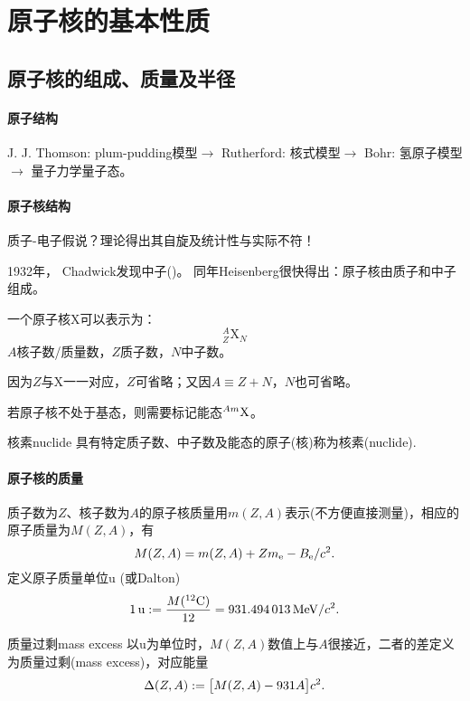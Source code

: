 \section{原子核的基本性质}
\subsection{原子核的组成、质量及半径}
\paragraph{原子结构}J. J. Thomson: plum-pudding模型$\to$ Rutherford: 核式模型$\to$ Bohr: 氢原子模型$\to$ 量子力学量子态。
\paragraph{原子核结构}
质子-电子假说？理论得出其自旋及统计性与实际不符！

1932年， Chadwick发现中子()。
同年Heisenberg很快得出：原子核由质子和中子组成。

一个原子核X可以表示为：
\[
	_Z^A\mathrm X_N
\]
$A$核子数/质量数，$Z$质子数，$N$中子数。

因为$Z$与X一一对应，$Z$可省略；又因$A\equiv Z+N$，$N$也可省略。

若原子核不处于基态，则需要标记能态${^{Am}\mathrm{X}}$。
\begin{definition}{核素}{nuclide}
	具有特定质子数、中子数及能态的原子(核)称为核素(nuclide).
\end{definition}
\iffalse
\begin{definition}{原子核相关名词}{}
	\begin{compactitem}
		\item 核素：；
		\item 同位素：原子序数$Z$相同但质量数$A$不同的核素；
		\item 同位素丰度：元素中各同位素天然含量的原子数百分比；
		\item 同中异荷素：$N$相同，$Z$不同的核素；
		\item 同量异位素：$A$相同，$Z$(或$N$)不同的核素；
		\item 同质异能素：$Z$和$N$相同，而
		能态不同的核素；
		\item 偶$A$核、奇$A$核、偶偶核、奇奇核……
		\item 镜像核：$N$与$Z$互换的两个核素。
	\end{compactitem}
\end{definition}
\fi
\paragraph{原子核的质量}质子数为$Z$、核子数为$A$的原子核质量用$m(Z,A)$表示(不方便直接测量)，相应的原子质量为$M(Z,A)$，有
\[
	M(Z,A)=m(Z,A)+Zm_\mathrm e-B_\mathrm e/c^2.
\]
定义原子质量单位u (或Dalton)
\[
	\SI{1}{u}:=\frac{M({^{12}\mathrm{C}})}{12}=\SI{931.494013}{MeV}/c^2.
\]
\begin{definition}{质量过剩}{mass excess}
	以u为单位时，$M(Z,A)$数值上与$A$很接近，二者的差定义为质量过剩(mass excess)，对应能量
	\begin{align}
		\Delta(Z,A):=\bigl[M(Z,A)-931A\bigr]c^2.
	\end{align}
\end{definition}
